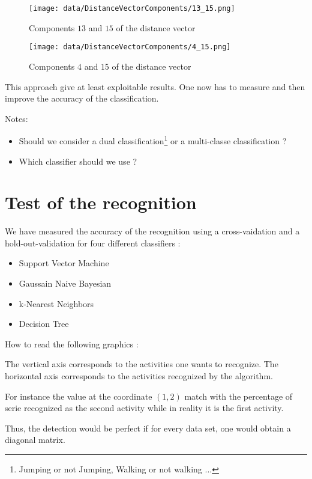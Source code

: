 \documentclass[a4,12pt]{article}
\begin{document}
	\begin{figure}[H]
		\centering
		\texttt{[image: data/DistanceVectorComponents/13\_15.png]}
		\caption{Components $13$ and $15$ of the distance vector}
		\label{dist_components}
	\end{figure}
	
	\begin{figure}[H]
		\centering
		\texttt{[image: data/DistanceVectorComponents/4\_15.png]}
		\caption{Components $4$ and $15$ of the distance vector}
		\label{dist_components}
	\end{figure}
	
	This approach give at least exploitable results. One now has to measure and then improve the accuracy of the classification.
	
	Notes:
	\begin{itemize}
		\item Should we consider a dual classification\footnote{Jumping or not Jumping, Walking or not walking ...} or a multi-classe classification ?
		\item Which classifier should we use ?
	\end{itemize}
	
	\section{Test of the recognition}
	
	We have measured the accuracy of the recognition using a cross-vaidation and a hold-out-validation for four different classifiers : 
	
	\begin{itemize}
		\item Support Vector Machine
		\item Gaussain Naive Bayesian
		\item k-Nearest Neighbors
		\item Decision Tree
	\end{itemize}
	
	How to read the following graphics : 
	
	The vertical axis corresponds to the activities one wants to recognize. The horizontal axis corresponds to the activities recognized by the algorithm.
	
	For instance the value at the coordinate $(1,2)$ match with the percentage of serie recognized as the second activity while in reality it is the first activity. 
	
	Thus, the detection would be perfect if for every data set, one would obtain a diagonal matrix.
	
\end{document}
